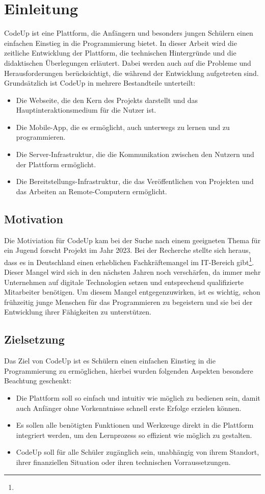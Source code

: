 \documentclass{subfiles}
\begin{document}
\chapter{Einleitung}\label{ch:intro}

CodeUp ist eine Plattform, die Anfängern und besonders jungen Schülern einen einfachen Einstieg in die Programmierung bietet.
In dieser Arbeit wird die zeitliche Entwicklung der Plattform, die technischen Hintergründe und die didaktischen Überlegungen erläutert.
Dabei werden auch auf die Probleme und Herausforderungen berücksichtigt, die während der Entwicklung aufgetreten sind.
Grundsätzlich ist CodeUp in mehrere Bestandteile unterteilt:
\begin{itemize}
    \item Die Webseite, die den Kern des Projekts darstellt und das Hauptinteraktionsmedium für die Nutzer ist.
    \item Die Mobile-App, die es ermöglicht, auch unterwegs zu lernen und zu programmieren.
    \item Die Server-Infrastruktur, die die Kommunikation zwischen den Nutzern und der Plattform ermöglicht.
    \item Die Bereitstellungs-Infrastruktur, die das Veröffentlichen von Projekten und das Arbeiten an Remote-Computern ermöglicht.
\end{itemize}

\section{Motivation}
Die Motiviation für CodeUp kam bei der Suche nach einem geeigneten Thema für ein Jugend forscht Projekt im Jahr 2023.
Bei der Recherche stellte sich heraus, dass es in Deutschland einen erheblichen Fachkräftemangel im IT-Bereich gibt\footnote{}.
Dieser Mangel wird sich in den nächsten Jahren noch verschärfen, da immer mehr Unternehmen auf digitale Technologien setzen und entsprechend qualifizierte Mitarbeiter benötigen.
Um diesem Mangel entgegenzuwirken, ist es wichtig, schon frühzeitig junge Menschen für das Programmieren zu begeistern und sie bei der Entwicklung ihrer Fähigkeiten zu unterstützen.

\section{Zielsetzung}
Das Ziel von CodeUp ist es Schülern einen einfachen Einstieg in die Programmierung zu ermöglichen, hierbei wurden folgenden Aspekten
besondere Beachtung geschenkt:
\begin{itemize}
    \item Die Plattform soll so einfach und intuitiv wie möglich zu bedienen sein, damit auch Anfänger ohne Vorkenntnisse schnell erste Erfolge erzielen können.
    \item Es sollen alle benötigten Funktionen und Werkzeuge direkt in die Plattform integriert werden, um den Lernprozess so effizient wie möglich zu gestalten.
    \item CodeUp soll für alle Schüler zugänglich sein, unabhängig von ihrem Standort, ihrer finanziellen Situation oder ihren technischen Vorraussetzungen.
\end{itemize}
\end{document}

